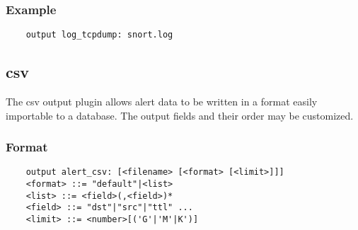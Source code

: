 \documentclass[english]{report}
\begin{document}
\subsubsection{Example}

\begin{verbatim}
    output log_tcpdump: snort.log
\end{verbatim}

\subsection{csv}

The csv output plugin allows alert data to be written in a format easily
importable to a database.  The output fields and their order may be customized.

\subsubsection{Format}

\begin{verbatim}
    output alert_csv: [<filename> [<format> [<limit>]]]
    <format> ::= "default"|<list>
    <list> ::= <field>(,<field>)*
    <field> ::= "dst"|"src"|"ttl" ...
    <limit> ::= <number>[('G'|'M'|K')]
\end{verbatim}
\end{document}
